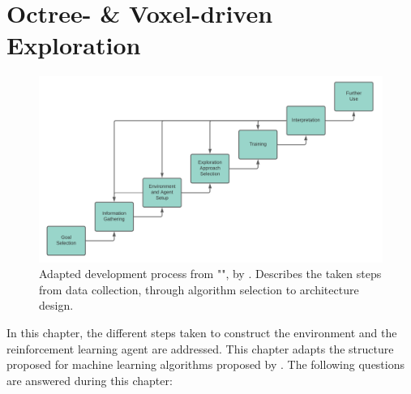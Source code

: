 \chapter{Octree- \&
Voxel-driven Exploration}\label{chap:3:title}

\begin{figure}[!ht]
        \centering
        \includegraphics[width=1\textwidth]{images/adapted_development_process_exploration_v2.png}
        \caption{Adapted development process from "", by \textcite{luckert2016using}. Describes the taken steps from data collection, through algorithm selection to architecture design.}
        \label{fig:development_design}
\end{figure}
In this chapter, the different steps taken to construct the environment and the reinforcement learning agent are addressed. 
This chapter adapts the structure proposed for machine learning algorithms proposed by \textcite{luckert2016using}.
The following questions are answered during this chapter:
